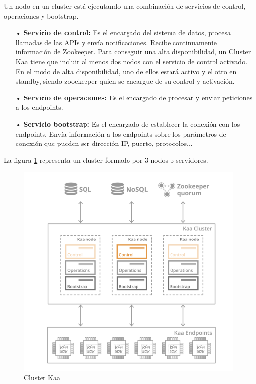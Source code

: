 \documentclass[12pt, twoside]{book}
\begin{document}
Un nodo en un cluster está ejecutando una combinación de servicios de control, operaciones y bootstrap.
\begin{itemize}
\item[•] \textbf{Servicio de control: }Es el encargado del sistema de datos, procesa llamadas de las APIs y envía notificaciones. Recibe continuamente información de Zookeeper. Para conseguir una alta disponibilidad, un Cluster Kaa tiene que incluir al menos dos nodos con el servicio de control activado. En el modo de alta disponibilidad, uno de ellos estará activo y el otro en standby, siendo zooekeeper quien se encargue de su control y activación.\\
\item[•]\textbf{Servicio de operaciones: }Es el encargado de procesar y enviar peticiones a los endpoints.\\
\item[•]\textbf{Servicio bootstrap: } Es el encargado de establecer la conexión con los endpoints. Envía información a los endpoints sobre los parámetros de conexión que pueden ser dirección IP, puerto, protocolos...
\end{itemize}
La figura \ref{cluster:kaa} representa un cluster formado por 3 nodos o servidores.
\begin{figure}[H]
\centering
\includegraphics[scale=0.6]{images/arquitectura_kaa}
\caption{Cluster Kaa}\label{cluster:kaa}
\end{figure}
\end{document}
